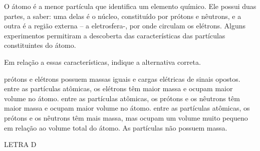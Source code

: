 \documentclass[9qpt]{scrartcl}
\date{\today}
\title{}
\def\disciplina{Química}
\begin{document}
\twocolumn[
%

%
%



%

\smallbreak
\medbreak
\par\vspace{2ex}]%



\begin{exercise}[points=1.0]
O átomo é a menor partícula que identifica um elemento químico. Ele possui duas partes, a saber: uma delas é o núcleo, constituído por prótons e nêutrons, e a outra é a região externa – a eletrosfera-, por onde circulam os elétrons. Alguns experimentos permitiram a descoberta das características das partículas constituintes do átomo.

Em relação a essas características, indique a alternativa correta.

\begin{choice}
\choice prótons e elétrons possuem massas iguais e cargas elétricas de sinais opostos.
\choice  entre as partículas atômicas, os elétrons têm maior massa e ocupam maior volume no átomo.
\choice entre as partículas atômicas, os prótons e os nêutrons têm maior massa e ocupam maior volume no átomo.
\choice entre as partículas atômicas, os prótons e os nêutrons têm mais massa, mas ocupam um volume muito pequeno em relação ao volume total do átomo.
\choice As partículas não possuem massa.
\end{choice}
\end{exercise}
\begin{solution}
LETRA D
\end{solution}
\end{document}
